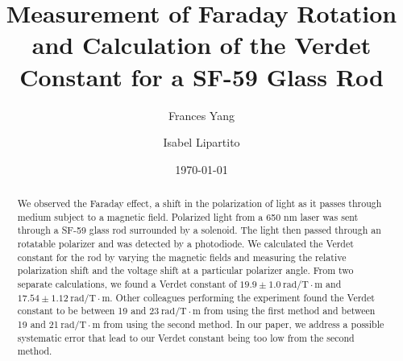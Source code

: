 \documentclass[prb,preprint]{revtex4-1}
\begin{document}
\title{Measurement of Faraday Rotation and Calculation of the Verdet Constant for a SF-59 Glass Rod}

\author{Frances Yang}

\author{Isabel Lipartito}

\date{\today}

\begin{abstract}
{We observed the Faraday effect, a shift in the polarization of light as it passes through medium subject to a magnetic field. Polarized light from a 650 nm laser was sent through a SF-59 glass rod surrounded by a solenoid. The light then passed through an rotatable polarizer and was detected by a photodiode. We calculated the Verdet constant for the rod by varying the magnetic fields and measuring the relative polarization shift and the voltage shift at a particular polarizer angle. From two separate calculations, we found a Verdet constant of $19.9 \pm 1.0 \mathrm{~rad/T} \cdot \textrm{m}$ and $17.54 \pm 1.12 \mathrm{~rad/T} \cdot \textrm{m}$. Other colleagues performing the experiment found the Verdet constant to be between 19 and 23$\mathrm{~rad/T} \cdot \textrm{m}$ from using the first method and between 19 and 21$\mathrm{~rad/T} \cdot \textrm{m}$ from using the second method.  In our paper, we address a possible systematic error that lead to our Verdet constant being too low from the second method.

}
\end{abstract}
\end{document}
